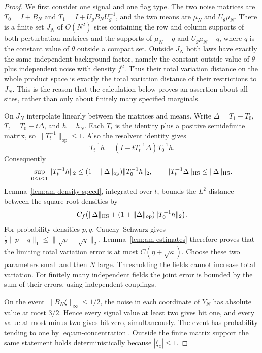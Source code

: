 \begin{proof}
We first consider one signal and one flag type.  The two noise matrices are
$T_0=I+B_N$ and $T_1=I+U_gB_NU_g^{-1}$, and the two means are $\mu_N$
and $U_g\mu_N$.  There is a finite set $J_N$ of $O(N^2)$ sites containing
the row and column supports of both perturbation matrices and the supports
of $\mu_N-q$ and $U_g\mu_N-q$, where $q$ is the constant value of
$\theta$ outside a compact set.  Outside $J_N$ both laws have exactly the same
independent background factor, namely the constant outside value of
$\theta$ plus independent noise with density $f^2$.  Thus their total
variation distance on the whole product space is exactly the total
variation distance of their restrictions to $J_N$.  This is the reason
that the calculation below proves an assertion about all sites, rather
than only about finitely many specified marginals.

On $J_N$ interpolate linearly between the matrices and means.  Write
$\Delta=T_1-T_0$, $T_t=T_0+t\Delta$, and $h=h_N$.
Each $T_t$ is the identity plus a positive semidefinite matrix, so
$\|T_t^{-1}\|_{\mathrm{op}}\le1$.  Also the resolvent identity gives
\begin{equation}\label{eq:am-resolvent}
 T_t^{-1}h=(I-tT_t^{-1}\Delta)T_0^{-1}h.
\end{equation}
Consequently
\[
 \sup_{0\le t\le1}\|T_t^{-1}h\|_2
 \le(1+\|\Delta\|_{\mathrm{op}})\|T_0^{-1}h\|_2,
 \qquad
 \|T_t^{-1}\Delta\|_{\mathrm{HS}}\le\|\Delta\|_{\mathrm{HS}}.
\]
Lemma~\ref{lem:am-density-speed}, integrated over $t$, bounds the
$L^2$ distance between the square-root densities by
\[
 C_f\bigl(\|\Delta\|_{\mathrm{HS}}
 +(1+\|\Delta\|_{\mathrm{op}})\|T_0^{-1}h\|_2\bigr).
\]
For probability densities $p,q$, Cauchy--Schwarz gives
$\frac12\|p-q\|_1\le\|\sqrt p-\sqrt q\|_2$.
Lemma~\ref{lem:am-estimates} therefore proves that the limiting total
variation error is at most $C(\eta+\sqrt\kappa)$.  Choose these two
parameters small and then $N$ large.  Thresholding the fields cannot
increase total variation.  For finitely many independent fields the joint
error is bounded by the sum of their errors, using independent couplings.

On the event $\|B_N\xi\|_\infty\le1/2$, the noise in each coordinate of
$Y_N$ has absolute value at most $3/2$.  Hence every signal value at least
two gives bit one, and every value at most minus two gives bit zero,
simultaneously.  The event has probability tending to one by
\eqref{eq:am-concentration}.  Outside the finite matrix support the same
statement holds deterministically because $|\xi_z|\le1$.
\end{proof}

